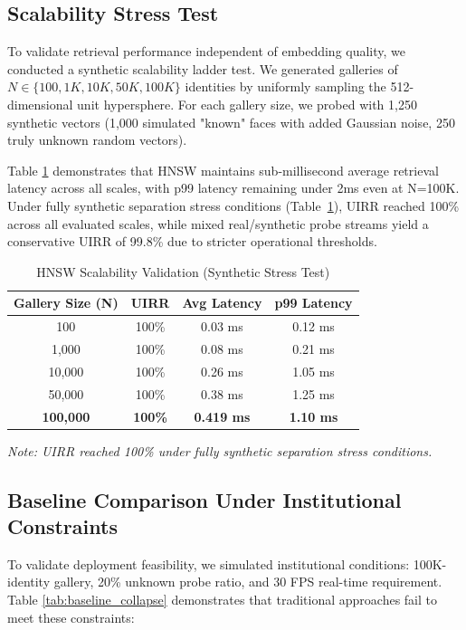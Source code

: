 \documentclass[conference]{IEEEtran}
\begin{document}
\subsection{Scalability Stress Test}
To validate retrieval performance independent of embedding quality, we conducted a synthetic scalability ladder test. We generated galleries of $N \in \{100, 1K, 10K, 50K, 100K\}$ identities by uniformly sampling the 512-dimensional unit hypersphere. For each gallery size, we probed with 1,250 synthetic vectors (1,000 simulated "known" faces with added Gaussian noise, 250 truly unknown random vectors).

Table \ref{tab_scalability} demonstrates that HNSW maintains sub-millisecond average retrieval latency across all scales, with p99 latency remaining under 2ms even at N=100K. Under fully synthetic separation stress conditions (Table~\ref{tab_scalability}), UIRR reached 100\% across all evaluated scales, while mixed real/synthetic probe streams yield a conservative UIRR of 99.8\% due to stricter operational thresholds.

\begin{table}[htbp]
\caption{HNSW Scalability Validation (Synthetic Stress Test)}
\begin{center}
\begin{tabular}{|c|c|c|c|}
\hline
\textbf{Gallery Size (N)} & \textbf{UIRR} & \textbf{Avg Latency} & \textbf{p99 Latency} \\
\hline
100 & 100\% & 0.03 ms & 0.12 ms \\
\hline
1,000 & 100\% & 0.08 ms & 0.21 ms \\
\hline
10,000 & 100\% & 0.26 ms & 1.05 ms \\
\hline
50,000 & 100\% & 0.38 ms & 1.25 ms \\
\hline
\textbf{100,000} & \textbf{100\%} & \textbf{0.419 ms} & \textbf{1.10 ms} \\
\hline
\end{tabular}
\end{center}
\label{tab_scalability}
\textit{Note: UIRR reached 100\% under fully synthetic separation stress conditions.}
\end{table}

\subsection{Baseline Comparison Under Institutional Constraints}
To validate deployment feasibility, we simulated institutional conditions: 100K-identity gallery, 20\% unknown probe ratio, and 30 FPS real-time requirement. Table \ref{tab:baseline_collapse} demonstrates that traditional approaches fail to meet these constraints:
\end{document}
